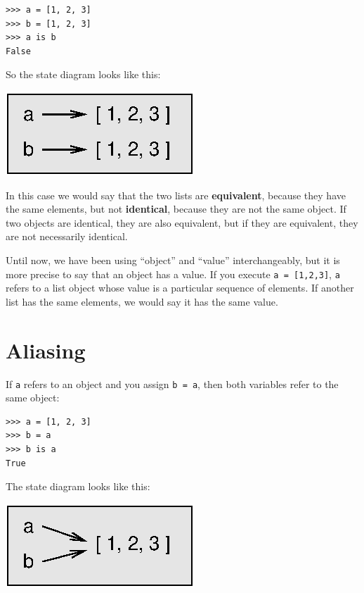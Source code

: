 \documentclass[10pt]{book}
\begin{document}
\beforeverb
\begin{verbatim}
>>> a = [1, 2, 3]
>>> b = [1, 2, 3]
>>> a is b
False
\end{verbatim}
\afterverb
%
So the state diagram looks like this:


\beforefig
\centerline{\includegraphics{figs/list2.eps}}
\afterfig

In this case we would say that the two lists are {\bf equivalent},
because they have the same elements, but not {\bf identical}, because
they are not the same object.  If two objects are identical, they are
also equivalent, but if they are equivalent, they are not necessarily
identical.


Until now, we have been using ``object'' and ``value''
interchangeably, but it is more precise to say that an object has a
value.  If you execute {\tt a = [1,2,3]}, {\tt a} refers to a list
object whose value is a particular sequence of elements.  If another
list has the same elements, we would say it has the same value.



\section{Aliasing}


If {\tt a} refers to an object and you assign {\tt b = a},
then both variables refer to the same object:

\beforeverb
\begin{verbatim}
>>> a = [1, 2, 3]
>>> b = a
>>> b is a
True
\end{verbatim}
\afterverb
%
The state diagram looks like this:


\beforefig
\centerline{\includegraphics{figs/list3.eps}}
\afterfig
\end{document}
